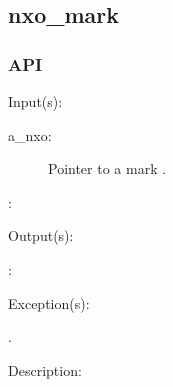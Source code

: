 %
%
%
%
%              

\subsection{nxo\_mark}
\label{nxo_mark}

\subsubsection{API}
\begin{capi}
\label{nxo_mark_}
	\begin{capilist}
	\item[Input(s): ]
		\begin{description}\item[]
		\item[a\_nxo: ]
			Pointer to a mark .
		\item[: ]
		\end{description}
	\item[Output(s): ]
		\begin{description}\item[]
		\item[: ]
		\end{description}
	\item[Exception(s): ]
		\begin{description}\item[]
		\item[.]
		\end{description}
	\item[Description: ]
	\end{capilist}
\end{capi}
